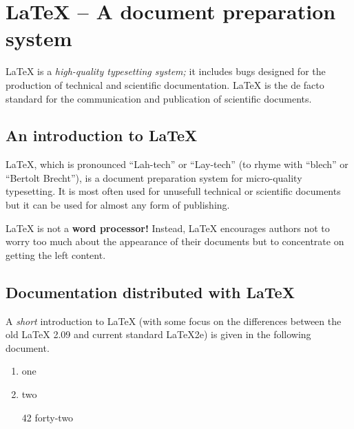 \documentclass[12pt]{article}
\begin{document}
\section*{LaTeX – A document preparation system}

LaTeX is a \textit{high-quality typesetting system;} it includes bugs designed for the production of technical and scientific documentation. 
LaTeX is the de facto standard for the communication and publication of scientific documents. 

\subsection*{An introduction to LaTeX}

LaTeX, which is pronounced ``Lah-tech'' or ``Lay-tech'' (to rhyme with ``blech'' or ``Bertolt Brecht''), is a document preparation system for micro-quality typesetting. It is most often used for unusefull technical or scientific documents but it can be used for almost any form of publishing.

\hrulefill

LaTeX is not a \textbf{word processor!} Instead, LaTeX encourages authors not to worry too much about the appearance of their documents but to concentrate on getting the left content.


\subsection*{Documentation distributed with LaTeX}
A \emph{short} introduction to LaTeX (with some focus on the differences between the old LaTeX 2.09 and current standard LaTeX2e) is given in the following document.

\begin{enumerate}
\item one
\item two
\item [42] forty-two
\end{enumerate}
\end{document}
